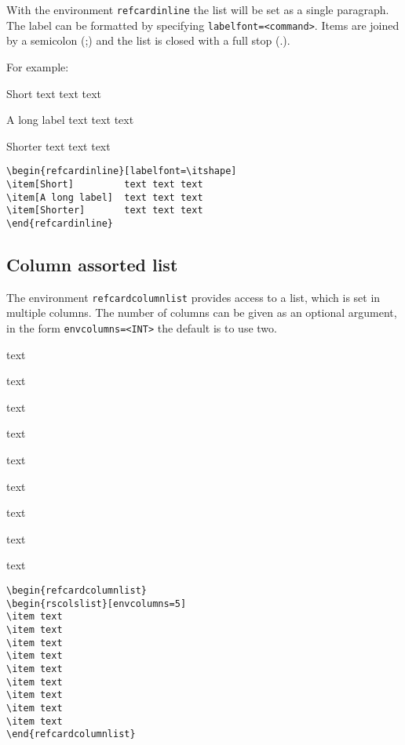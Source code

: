 \documentclass[   %
  final,          %
  a4paper,        %
  columns=3,       %
  margin=1.0cm,   %
]{refcard}
\begin{document}
With the environment \lstinline`refcardinline` the list will be
set as a single paragraph.
The label can be formatted by specifying \lstinline`labelfont=<command>`.
Items are joined by a semicolon (;) and the list is closed with a full stop (.).

For example: 
\begin{refcardinline}[labelfont=\itshape]
\item[Short]         text text text 
\item[A long label]  text text text 
\item[Shorter]       text text text 
\end{refcardinline}

\begin{lstlisting}
\begin{refcardinline}[labelfont=\itshape]
\item[Short]         text text text 
\item[A long label]  text text text 
\item[Shorter]       text text text 
\end{refcardinline}
\end{lstlisting}

\subsection{Column assorted list}

The environment \lstinline`refcardcolumnlist` provides access to a list, 
which is set in multiple columns.
The number of columns can be given as an optional argument,
in the form \lstinline`envcolumns=<INT>`
the default is to use two.

\begin{refcardcolumnlist}[envcolumns=5]
\item text
\item text
\item text
\item text
\item text
\item text
\item text
\item text
\item text
\end{refcardcolumnlist}

\begin{lstlisting}
\begin{refcardcolumnlist}
\begin{rscolslist}[envcolumns=5]
\item text
\item text
\item text
\item text
\item text
\item text
\item text
\item text
\item text
\end{refcardcolumnlist}
\end{lstlisting}
\end{document}
